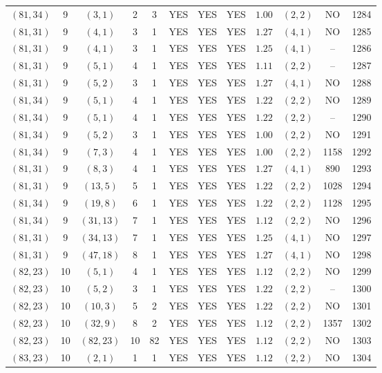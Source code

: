 \begin{longtable}{|c|c|c|c|c|c|c|c|c|c|c|c|}
$(81,34)$ & 9 & $(3,1)$ & 2 & 3 & YES & YES & YES & $1.00$ & $(2,2)$ & NO & 1284\\
$(81,31)$ & 9 & $(4,1)$ & 3 & 1 & YES & YES & YES & $1.27$ & $(4,1)$ & NO & 1285\\
$(81,31)$ & 9 & $(4,1)$ & 3 & 1 & YES & YES & YES & $1.25$ & $(4,1)$ & -- & 1286\\
$(81,31)$ & 9 & $(5,1)$ & 4 & 1 & YES & YES & YES & $1.11$ & $(2,2)$ & -- & 1287\\
$(81,31)$ & 9 & $(5,2)$ & 3 & 1 & YES & YES & YES & $1.27$ & $(4,1)$ & NO & 1288\\
$(81,34)$ & 9 & $(5,1)$ & 4 & 1 & YES & YES & YES & $1.22$ & $(2,2)$ & NO & 1289\\
$(81,34)$ & 9 & $(5,1)$ & 4 & 1 & YES & YES & YES & $1.22$ & $(2,2)$ & -- & 1290\\
$(81,34)$ & 9 & $(5,2)$ & 3 & 1 & YES & YES & YES & $1.00$ & $(2,2)$ & NO & 1291\\
$(81,34)$ & 9 & $(7,3)$ & 4 & 1 & YES & YES & YES & $1.00$ & $(2,2)$ & 1158 & 1292\\
$(81,31)$ & 9 & $(8,3)$ & 4 & 1 & YES & YES & YES & $1.27$ & $(4,1)$ & 890 & 1293\\
$(81,31)$ & 9 & $(13,5)$ & 5 & 1 & YES & YES & YES & $1.22$ & $(2,2)$ & 1028 & 1294\\
$(81,34)$ & 9 & $(19,8)$ & 6 & 1 & YES & YES & YES & $1.22$ & $(2,2)$ & 1128 & 1295\\
$(81,34)$ & 9 & $(31,13)$ & 7 & 1 & YES & YES & YES & $1.12$ & $(2,2)$ & NO & 1296\\
$(81,31)$ & 9 & $(34,13)$ & 7 & 1 & YES & YES & YES & $1.25$ & $(4,1)$ & NO & 1297\\
$(81,31)$ & 9 & $(47,18)$ & 8 & 1 & YES & YES & YES & $1.27$ & $(4,1)$ & NO & 1298\\
$(82,23)$ & 10 & $(5,1)$ & 4 & 1 & YES & YES & YES & $1.12$ & $(2,2)$ & NO & 1299\\
$(82,23)$ & 10 & $(5,2)$ & 3 & 1 & YES & YES & YES & $1.22$ & $(2,2)$ & -- & 1300\\
$(82,23)$ & 10 & $(10,3)$ & 5 & 2 & YES & YES & YES & $1.22$ & $(2,2)$ & NO & 1301\\
$(82,23)$ & 10 & $(32,9)$ & 8 & 2 & YES & YES & YES & $1.12$ & $(2,2)$ & 1357 & 1302\\
$(82,23)$ & 10 & $(82,23)$ & 10 & 82 & YES & YES & YES & $1.12$ & $(2,2)$ & NO & 1303\\
$(83,23)$ & 10 & $(2,1)$ & 1 & 1 & YES & YES & YES & $1.12$ & $(2,2)$ & NO & 1304\\

\end{longtable}
